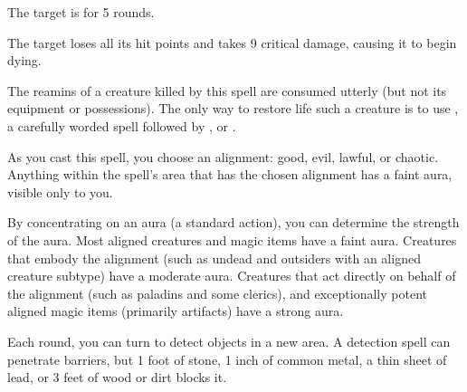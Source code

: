 \spellrng{\rngclose}
\begin{spellhealthy}
  The target is \staggered for 5 rounds.
\end{spellhealthy}
\begin{spellblood}
  The target loses all its hit points and takes 9 critical damage, causing it to begin dying.
\end{spellblood}
\begin{spellnotes}
  The reamins of a creature killed by this spell are consumed utterly (but not its equipment or possessions). The only way to restore life such a creature is to use , a carefully worded  spell followed by , or .
\end{spellnotes}

\begin{spelleffect}
    As you cast this spell, you choose an alignment: good, evil, lawful, or chaotic. Anything within the spell's area that has the chosen alignment has a faint aura, visible only to you.
    
    By concentrating on an aura (a standard action), you can determine the strength of the aura. Most aligned creatures and magic items have a faint aura. Creatures that embody the alignment (such as undead and outsiders with an aligned creature subtype) have a moderate aura. Creatures that act directly on behalf of the alignment (such as paladins and some clerics), and exceptionally potent aligned magic items (primarily artifacts) have a strong aura.
\end{spelleffect}
\begin{spellnotes}
  Each round, you can turn to detect objects in a new area. A detection spell can penetrate barriers, but 1 foot of stone, 1 inch of common metal, a thin sheet of lead, or 3 feet of wood or dirt blocks it.
\end{spellnotes}


